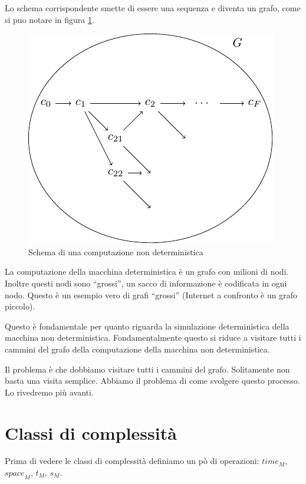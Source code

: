 Lo schema corrispondente smette di essere una sequenza e diventa un grafo, come si puo notare in
figura \ref{img:nondetcomp}.

\begin{figure}[h]
    \begin{center}
        \includegraphics{img/NonDetComputation.pdf}
        \caption{Schema di una computazione non deterministica}
        \label{img:nondetcomp}
    \end{center}
\end{figure}

La computazione della macchina deterministica è un grafo con milioni di nodi. Inoltre questi nodi
sono ``grossi'', un sacco di informazione è codificata in ogni nodo. Questo è un esempio vero di
grafi ``grossi'' (Internet a confronto è un grafo piccolo).

Questo è fondamentale per quanto riguarda la simulazione deterministica della macchina non
deterministica. Fondamentalmente questo si riduce a visitare tutti i cammini del grafo della
computazione della macchina non deterministica.

Il problema è che dobbiamo visitare tutti i cammini del grafo. Solitamente non basta una visita
semplice. Abbiamo il problema di come svolgere questo processo. Lo rivedremo più avanti.

\section{Classi di complessità}

Prima di vedere le classi di complessità definiamo un pò di operazioni: $\textit{time}_{M}$,
$\textit{space}_{M}$, $t_{M}$, $s_{M}$.

